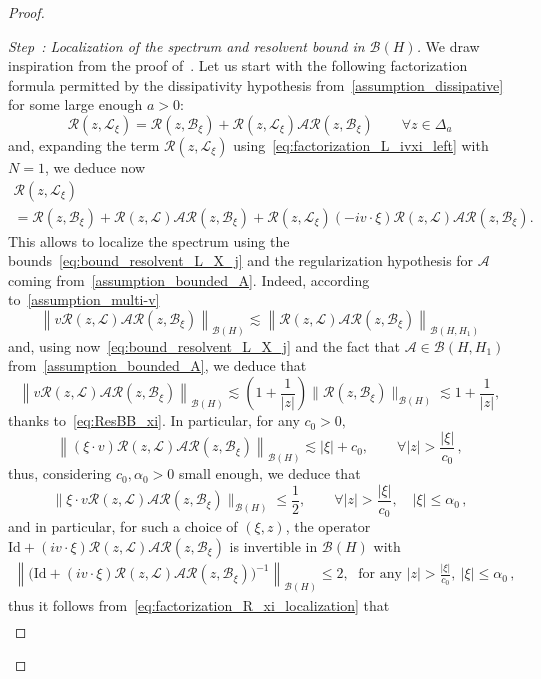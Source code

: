 \documentclass[AHL,Unicode,longabstracts,published]{cedram}
\newcommand{\Id}{\mathrm{Id}}
\renewcommand{\AA}{\mathcal{A}}
\newcommand{\BB}{\mathcal{B}}
\newcommand{\LL}{\mathcal{L}}
\newcommand{\RR}{\mathcal{R}}
\newcommand{\BBB}{\mathscr{B}}
\newcommand{\Ss}{H}
\renewcommand*\le{\leqslant}
\renewcommand*\leq{\leqslant}
\newcounter{stepcount}
\newenvironment{step}[1]{\refstepcounter{stepcount}\begin{proof}[Step~\thestepcount: #1]}{\let\qed\relax\end{proof}}
\let\oldforall\forall
\renewcommand*{\forall}{\mathrel{\oldforall}}
\begin{document}
\begin{proof}
\begin{step}{{Localization of the spectrum and resolvent bound in $\BBB(\Ss)$}}
We draw inspiration from the proof of~\cite[Lemma~2.16]{T2016}. Let us start with the following factorization formula permitted by the dissipativity hypothesis from~\eqref{assumption_dissipative} for some large enough $a > 0$:
\[
\RR(z,\LL_{\xi}) = \RR(z,\BB_{\xi}) + \RR(z,\LL_{\xi}) \AA \RR(z,\BB_{\xi}) \qquad \forall z \in \Delta_{a}
\]
and, expanding the term $\RR(z,\LL_{\xi})$ using~\eqref{eq:factorization_L_ivxi_left} with $N = 1$, we deduce now
\begin{multline}\label{eq:factorization_R_xi_localization}
\RR(z,\LL_{\xi}) \\
=  \RR(z,\BB_{\xi}) + \RR(z,\LL) \AA \RR(z,\BB_{\xi}) + \RR(z,\LL_{\xi}) (- i v \cdot \xi) \RR(z,\LL) \AA \RR(z,\BB_{\xi}).
\end{multline}
This allows to localize the spectrum using the bounds~\eqref{eq:bound_resolvent_L_X_j} and the regularization hypothesis for $\AA$ coming from~\eqref{assumption_bounded_A}. Indeed, according to~\eqref{assumption_multi-v}
\[
\left\|v \RR(z,\LL) \AA \RR(z,\BB_{\xi}) \right\|_{\BBB(\Ss)} \lesssim \left\|\RR(z,\LL)\AA\RR(z,\BB_{\xi})\right\|_{\BBB(\Ss,\Ss_{1})}
\]
and, using now~\eqref{eq:bound_resolvent_L_X_j} and the fact that $\AA \in \BBB(\Ss,\Ss_{1})$ from~\eqref{assumption_bounded_A}, we deduce that
\[
\left\|v \RR(z,\LL) \AA \RR(z,\BB_{\xi}) \right\|_{\BBB(\Ss)} \lesssim \left(1+\frac{1}{|z|}\right)\|\RR(z,\BB_{\xi})\|_{\BBB(\Ss)} \lesssim 1+\frac{1}{|z|},
\]
thanks to~\eqref{eq:ResBB_xi}. In particular, for any $c_0 >0,$
\[
\left\|\left(\xi \cdot v\right)\RR(z,\LL) \AA \RR(z,\BB_{\xi}) \right\|_{\BBB(\Ss)} \lesssim |\xi|+c_0, \qquad \forall | z | > \frac{| \xi |}{c_0}\,,
\]
thus, considering $c_0, \alpha_{0} > 0$ small enough, we deduce that
\[
\| \xi \cdot v \RR(z,\LL) \AA \RR(z,\BB_{\xi}) \|_{\BBB(\Ss)} \le \frac{1}{2}, \qquad \forall |z| > \frac{|\xi|}{c_0}, \quad | \xi | \le \alpha_0\,,
\]
and in particular, for such a choice of $(\xi, z)$, the operator $\Id + (i v \cdot \xi) \RR(z,\LL) \AA\RR(z,\BB_{\xi})$ is invertible in $\BBB(\Ss)$ with
\begin{multline}\label{eq:inverseId}
\left\|\Big(\Id + (i v \cdot \xi) \RR(z,\LL) \AA\RR(z,\BB_{\xi}) \Big)^{-1}\right\|_{\BBB(\Ss)} \leq 2,\;
\text{ for any } |z| > \frac{|\xi|}{c_0},~|\xi | \le \alpha_0\,,
\end{multline}
thus it follows from~\eqref{eq:factorization_R_xi_localization} that
\begin{align*}

\end{align*}
\end{step}
\end{proof}
\end{document}
